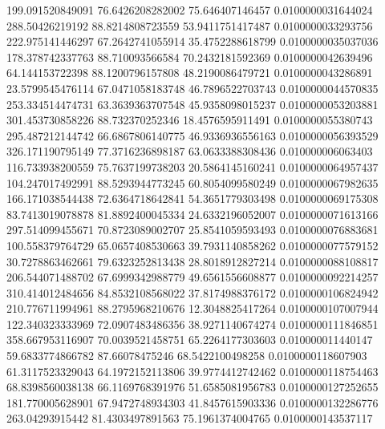         199.091520849091        76.6426208282002         75.646407146457      0.0100000031644024
         288.50426219192        88.8214808723559        53.9411751417487      0.0100000033293756
        222.975141446297        67.2642741055914        35.4752288618799      0.0100000035037036
        178.378742337763         88.710093566584        70.2432181592369      0.0100000042639496
         64.144153722398        88.1200796157808        48.2190086479721      0.0100000043286891
        23.5799545476114        67.0471058183748        46.7896522703743      0.0100000044570835
        253.334514474731        63.3639363707548        45.9358098015237      0.0100000053203881
        301.453730858226         88.732370252346        18.4576595911491      0.0100000055380743
        295.487212144742        66.6867806140775        46.9336936556163      0.0100000056393529
        326.171190795149        77.3716236898187        63.0633388308436       0.010000006063403
        116.733938200559        75.7637199738203        20.5864145160241      0.0100000064957437
        104.247017492991        88.5293944773245        60.8054099580249      0.0100000067982635
        166.171038544438        72.6364718642841        54.3651779303498      0.0100000069175308
        83.7413019078878        81.8892400045334        24.6332196052007      0.0100000071613166
        297.514099455671        70.8723089002707        25.8541059593493      0.0100000076883681
        100.558379764729        65.0657408530663        39.7931140858262      0.0100000077579152
        30.7278863462661        79.6323252813438        28.8018912827214      0.0100000088108817
        206.544071488702        67.6999342988779        49.6561556608877      0.0100000092214257
        310.414012484656        84.8532108568022        37.8174988376172      0.0100000106824942
        210.776711994961        88.2795968210676        12.3048825417264      0.0100000107007944
        122.340323333969        72.0907483486356        38.9271140674274      0.0100000111846851
        358.667953116907        70.0039521458751        65.2264177303603       0.010000011440147
        59.6833774866782          87.66078475246        68.5422100498258      0.0100000118607903
        61.3117523329043        64.1972152113806        39.9774412742462      0.0100000118754463
        68.8398560038138        66.1169768391976        51.6585081956783      0.0100000127252655
        181.770005628901        67.9472748934303        41.8457615903336      0.0100000132286776
         263.04293915442        81.4303497891563        75.1961374004765      0.0100000143537117
